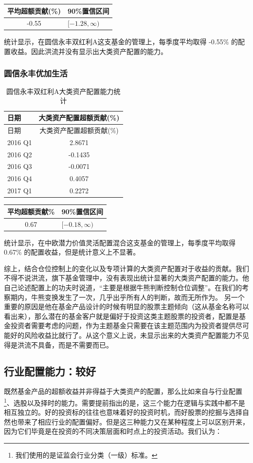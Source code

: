 \documentclass[hyperref,]{ctexart}
\begin{document}
\begin{longtable}[]{@{}cl@{}}
\toprule
平均超额贡献(\%) & 90\%置信区间\tabularnewline
\midrule
\endhead
-0.55 & \([-1.28,\infty)\)\tabularnewline
\bottomrule
\end{longtable}

统计显示，在圆信永丰双红利A这支基金的管理上，每季度平均取得 -0.55\%
的配置收益。因此洪流并没有显示出大类资产配置的能力。

\subsubsection{圆信永丰优加生活}\label{-2}

\begin{longtable}[]{@{}lc@{}}
\caption{圆信永丰双红利A大类资产配置能力统计}\tabularnewline
\toprule
日期 & 大类资产配置超额贡献(\%)\tabularnewline
\midrule
\endfirsthead
\toprule
日期 & 大类资产配置超额贡献(\%)\tabularnewline
\midrule
\endhead
2016 Q1 & 2.8671\tabularnewline
2016 Q2 & -0.1435\tabularnewline
2016 Q3 & -0.0071\tabularnewline
2016 Q4 & 0.4057\tabularnewline
2017 Q1 & 0.2272\tabularnewline
\bottomrule
\end{longtable}

\begin{longtable}[]{@{}cl@{}}
\toprule
平均超额贡献\% & 90\%置信区间\tabularnewline
\midrule
\endhead
0.67 & \([-0.18,\infty)\)\tabularnewline
\bottomrule
\end{longtable}

统计显示，在中欧潜力价值灵活配置混合这支基金的管理上，每季度平均取得
0.67\% 的配置收益，但是统计意义上不显著。

综上，结合仓位控制上的变化以及专项计算的大类资产配置对于收益的贡献。我们不得不说洪流，旗下基金管理中，没有表现出统计显著的大类资产配置的能力。他自己论述配置上的功夫时说道，``主要是根据牛熊判断控制仓位调整''。在我们的考察期内，牛熊变换发生了一次，几乎出乎所有人的判断，故而无所作为。
另一个重要的原因是他在基金产品设计的时候有明显的股票主题倾向（这从基金名称可以看出来），那么潜在的基金客户就是偏好于投资这类主题股票的投资者，配置是基金投资者需要考虑的问题，作为主题基金只需要在该主题范围内为投资者提供尽可能好的风险收益比就行了。从这个意义上说，未显示出来的大类资产配置能力不见得是洪流不具备，而是不需要而已。

\subsection{行业配置能力：较好}

既然基金产品的超额收益并非得益于大类资产的配置，那么比如来自与行业配置\footnote{我们使用的是证监会行业分类（一级）标准。}、选股以及择时的能力。需要提前指出的是，这三个能力在逻辑与实践中都不是相互独立的。好的投资标的往往也意味着好的投资时机，而好股票的挖掘与选择自然也带来了相应行业的配置偏好。但是这三种能力又在某种程度上可以区别开来，因为它们毕竟是在投资的不同决策层面和时点上的投资活动。我们认为：
\end{document}
